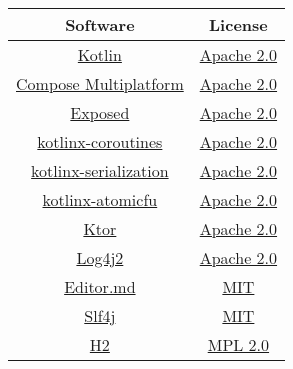 \documentclass[a4paper]{article}
\begin{document}
    \begin{table}[H]
        \begin{tabular}{c|c}
            Software                                                                         & License                                                                                       \\
            \hline
            \href{https://github.com/JetBrains/kotlin}{Kotlin}                               & \href{https://github.com/JetBrains/kotlin/blob/master/license/LICENSE.txt}{Apache 2.0}        \\
            \href{https://github.com/JetBrains/compose-multiplatform}{Compose Multiplatform} & \href{https://github.com/JetBrains/compose-multiplatform/blob/master/LICENSE.txt}{Apache 2.0} \\
            \href{https://github.com/JetBrains/Exposed}{Exposed}                             & \href{https://github.com/JetBrains/Exposed/blob/main/LICENSE.txt}{Apache 2.0}                 \\
            \href{https://github.com/Kotlin/kotlinx.coroutines}{kotlinx-coroutines}          & \href{https://github.com/Kotlin/kotlinx.coroutines/blob/master/LICENSE.txt}{Apache 2.0}       \\
            \href{https://github.com/Kotlin/kotlinx.serialization}{kotlinx-serialization}    & \href{https://github.com/Kotlin/kotlinx.serialization/blob/master/LICENSE.txt}{Apache 2.0}    \\
            \href{https://github.com/Kotlin/kotlinx-atomicfu}{kotlinx-atomicfu}              & \href{https://github.com/Kotlin/kotlinx-atomicfu/blob/master/LICENSE.txt}{Apache 2.0}         \\
            \href{https://github.com/ktorio/ktor}{Ktor}                                      & \href{https://github.com/ktorio/ktor/blob/main/LICENSE}{Apache 2.0}                           \\
            \href{https://github.com/apache/logging-log4j2}{Log4j2}                          & \href{https://github.com/apache/logging-log4j2/blob/2.x/LICENSE.txt}{Apache 2.0}              \\
            \href{https://github.com/pandao/editor.md}{Editor.md}                            & \href{https://github.com/pandao/editor.md/blob/master/LICENSE}{MIT}                           \\
            \href{https://github.com/qos-ch/slf4j}{Slf4j}                                    & \href{https://github.com/qos-ch/slf4j/blob/master/LICENSE.txt}{MIT}                           \\
            \href{https://www.h2database.com/html/main.html}{H2}                             & \href{https://www.h2database.com/html/license.html}{MPL 2.0}                                  \\
        \end{tabular}
    \end{table}
\end{document}
